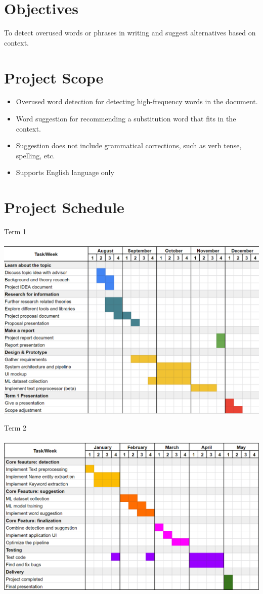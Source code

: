 \documentclass[12pt,oneside,openright,a4paper]{cpe-english-project}
\begin{document}
\section{Objectives}
To detect overused words or phrases in writing and suggest alternatives based on context.

\section{Project Scope}
\begin{itemize}
\item Overused word detection for detecting high-frequency words in the document.
\item Word suggestion for recommending a substitution word that fits in the context.
\item Suggestion does not include grammatical corrections, such as verb tense, spelling, etc.
\item Supports English language only
\end{itemize}

\section{Project Schedule}
Term 1\\ \\
\includegraphics[width=15cm]{./img/chp1/schedule1.png}

Term 2\\ \\
\includegraphics[width=15cm]{./img/chp1/schedule2.png}
\end{document}
